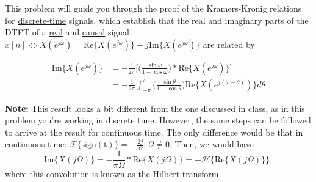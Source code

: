 \documentclass[12pt]{report}
\begin{document}
\newpage


This problem will guide you through the proof of the Kramers-Kronig relations for \underline{discrete-time} signals, which establish that the real and imaginary parts of the DTFT of a \underline{real} and \underline{causal} signal $x[n] \Longleftrightarrow X(e^{j\omega}) = \mathrm{Re}\{X(e^{j\omega})\} + j\mathrm{Im}\{X(e^{j\omega})\}$ are related by 

\begin{align} \nonumber
\mathrm{Im}\{X(e^{j\omega})\} &= -\frac{1}{2\pi}\bigg[\Big(\frac{\sin\omega}{1-\cos\omega}\Big)\ast \mathrm{Re}\{X(e^{j\omega})\}\bigg] \\
&=-\frac{1}{2\pi}\int_{-\pi}^{\pi}\bigg(\frac{\sin\theta}{1-\cos\theta}\bigg)\mathrm{Re}\{X(e^{j(\omega-\theta)})\}d\theta
\end{align}

\noindent\textbf{Note:} This result looks a bit different from the one discussed in class, as in this problem you're working in discrete time. However, the same steps  can be followed to arrive at the result for continuous time. The only difference would be that in continuous time: $\mathcal{F}\{\mathrm{sign(t)}\} = -\frac{2j}{\Omega}, \Omega\neq 0$. Then, we would have
\begin{equation}
\mathrm{Im}\{X(j\Omega)\} = -\frac{1}{\pi\Omega}\ast \mathrm{Re}\{X(j\Omega)\} = -\mathcal{H}\{\mathrm{Re}\{X(j\Omega)\}\},
\end{equation}	
where this convolution is known as the Hilbert transform.
\end{document}

